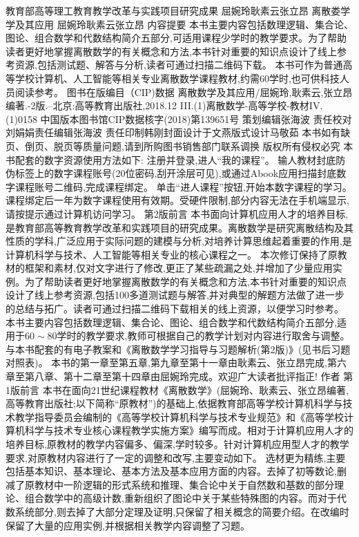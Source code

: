 {教育部高等理工教育教学改革与实践项目研究成果}
屈婉玲耿素云张立昂
{离散娄学学及其应用
屈婉玲耿素云张立昂
{内容提要}
本书主要内容包括数理逻辑、集合论、图论、组合数学和代数结构简介五部分,可适用课程少学时的教学要求。为了帮助读者更好地掌握离散数学的有关概念和方法,本书针对重要的知识点设计了线上参考资源,包括测试题、解答与分析,读者可通过扫描二维码下载。
本书可作为普通高等学校计算机、人工智能等相关专业离散数学课程教材,约需60学时,也可供科技人员阅读参考。
{图书在版编目（CIP)数据}
离散数学及其应用/屈婉玲,耿素云,张立昂编著.-2版.--北京:高等教育出版社,2018.12
III.(1)离散数学-高等学校-教材IV.(1)0158
中国版本图书馆CIP数据核字(2018)第139651号
策划编辑张海波
责任校对刘娟娟责任编辑张海波
责任印制韩刚封面设计于文燕版式设计马敬茹
本书如有缺页、倒页、脱页等质量问题,请到所购图书销售部门联系调换
版权所有侵权必究
{本书配套的数字资源使用方法如下:}
注册并登录,进人“我的课程”。
输人教材封底防伪标签上的数字课程账号(20位密码,刮开涂层可见),或通过Abook应用扫描封底数字课程账号二维码,完成课程绑定。
单击“进人课程”按钮,开始本数字课程的学习。
课程绑定后一年为数字课程使用有效期。受硬件限制,部分内容无法在手机端显示,请按提示通过计算机访问学习。
{第2版前言}
本书面向计算机应用人才的培养目标,是教育部高等教育教学改革和实践项目的研究成果。离散数学是研究离散结构及其性质的学科,广泛应用于实际问题的建模与分析,对培养计算思维起着重要的作用,是计算机科学与技术、人工智能等相关专业的核心课程之一。
本次修订保持了原教材的框架和素材,仅对文字进行了修改,更正了某些疏漏之处,并增加了少量应用实例。为了帮助读者更好地掌握离散数学的有关概念和方法,本书针对重要的知识点设计了线上参考资源,包括100多道测试题与解答,并对典型的解题方法做了进一步的总结与拓广。读者可通过扫描二维码下载相关的线上资源，以便学习时参考。
本书主要内容包括数理逻辑、集合论、图论、组合数学和代数结构简介五部分,适用于$60\sim80$学时的教学要求,教师可根据自己的教学计划对内容进行取舍与调整。与本书配套的有电子教案和《离散数学学习指导与习题解析(第2版)》(见书后习题对照表)。
本书的第一章至第五章,第九章至第十一章由耿素云、张立昂完成,第六章至第八章、第十二章至第十四章由屈婉玲完成。欢迎广大读者批评指正!
作者
{第1版前言}
本书在面向21世纪课程教材《离散数学》(屈婉玲、耿素云、张立昂编著,高等教育出版社;以下简称“原教材”)的基础上,依据教育部高等学校计算机科学与技术教学指导委员会编制的《高等学校计算机科学与技术专业规范》和《高等学校计算机科学与技术专业核心课程教学实施方案》编写而成。相对于计算机应用人才的培养目标,原教材的教学内容偏多、偏深,学时较多。针对计算机应用型人才的教学要求,对原教材内容进行了一定的调整和改写,主要变动如下。
选材更为精练,主要包括基本知识、基本理论、基本方法及基本应用方面的内容。去掉了初等数论,删减了原教材中一阶逻辑的形式系统和推理、集合论中关于自然数和基数的部分理论、组合数学中的高级计数,重新组织了图论中关于某些特殊图的内容。而对于代数系统部分,则去掉了大部分定理及证明,只保留了相关概念的简要介绍。在改编时保留了大量的应用实例,并根据相关教学内容调整了习题。
}
